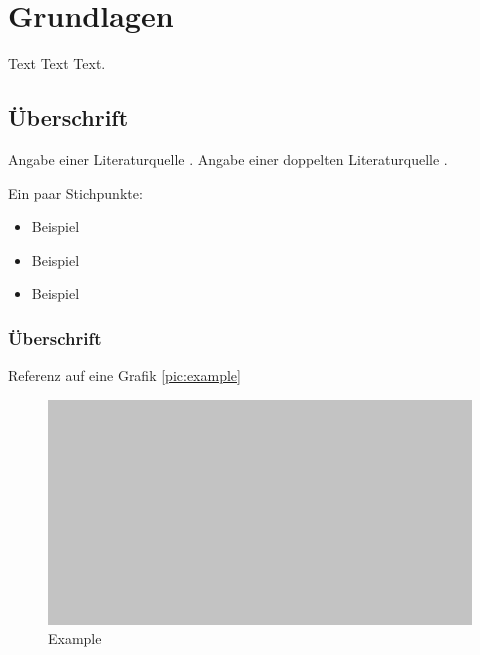 \chapter{Grundlagen}
\thispagestyle{fancy}
\label{chap:Grundlagen}

Text Text Text.


\section{Überschrift}
Angabe einer Literaturquelle \cite{BSI01}. Angabe einer doppelten Literaturquelle \cite{BSI01,CLU06}.

Ein paar Stichpunkte:
\begin{itemize}
	\item Beispiel
	\item Beispiel
	\item Beispiel
\end{itemize}


\subsection{Überschrift}
Referenz auf eine Grafik \autoref{pic:example} 

\begin{figure}[htb]
  	\centering
	\includegraphics[scale=0.5]{./source/images/Example.jpg}
  	\caption{Example \cite{MSD03}}
  	\label{pic:example}
\end{figure}
